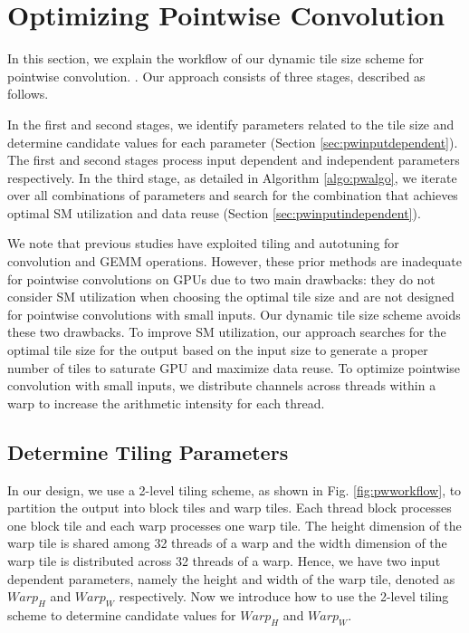\section{Optimizing Pointwise Convolution}
\label{sec:pwconv} 
In this section, we explain the workflow of our dynamic tile size scheme for pointwise convolution. . Our approach
consists of three stages, described as follows.

In the first and second stages, we identify parameters related to the tile size and determine candidate values for each parameter (Section
\ref{sec:pwinputdependent}). The first and second stages process input dependent and independent parameters respectively. In the third
stage, as detailed in Algorithm \ref{algo:pwalgo}, we iterate over all combinations of parameters and search for the combination that
achieves optimal SM utilization and data reuse (Section \ref{sec:pwinputindependent}).

We note that previous studies \cite{tanner2018tensile, kelefouras2016high, abdelfattah2019fast, kurzak2015implementation,
jiang2020enabling, tillet2017input, lan2019feathercnn,zhang2012autogeneration} have exploited tiling and autotuning for convolution and
GEMM operations. However, these prior methods are inadequate for pointwise convolutions on GPUs due to two main drawbacks: they do not
consider SM utilization when choosing the optimal tile size and are not designed for pointwise convolutions with small inputs. Our dynamic
tile size scheme avoids these two drawbacks. To improve SM utilization, our approach searches for the optimal tile size for the output
based on the input size to generate a proper number of tiles to saturate GPU and maximize data reuse. To optimize pointwise convolution
with small inputs, we distribute channels across threads within a warp to increase the arithmetic intensity for each thread.


\subsection{Determine Tiling Parameters\label{sec:pwinputdependent}}

In our design, we use a 2-level tiling scheme, as shown in Fig. \ref{fig:pwworkflow}, to partition the output into block tiles and warp tiles.
Each thread block processes one block tile and each warp processes one warp tile.
The height dimension of the warp tile is shared among 32 threads of a warp and the width dimension of the warp tile is distributed across 32 threads of a warp.
Hence, we have two input dependent parameters, namely the height and width of the warp tile, denoted as $Warp_H$ and $Warp_W$ respectively.
Now we introduce how to use the 2-level tiling scheme to determine candidate values for $Warp_H$ and $Warp_W$.
